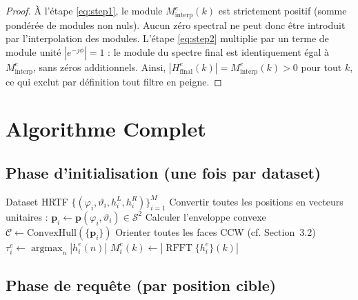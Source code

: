 \documentclass[12pt, a4paper]{article}
\theoremstyle{definition}
\newcommand{\vect}[1]{\bm{#1}}
\newcommand{\abs}[1]{\left| #1 \right|}
\DeclareMathOperator{\argmax}{argmax}
\DeclareMathOperator{\rfft}{RFFT}
\begin{document}
\begin{proof}
  À l'étape \eqref{eq:step1}, le module $M_{\mathrm{interp}}^e(k)$ est
  strictement positif (somme pondérée de modules non nuls). Aucun zéro
  spectral ne peut donc être introduit par l'interpolation des modules.
  L'étape \eqref{eq:step2} multiplie par un terme de module unité
  $|e^{-j\phi}| = 1$ : le module du spectre final est identiquement égal
  à $M_{\mathrm{interp}}^e$, sans zéros additionnels.
  Ainsi, $|H_{\mathrm{final}}^e(k)| = M_{\mathrm{interp}}^e(k) > 0$
  pour tout $k$, ce qui exclut par définition tout filtre en peigne.
\end{proof}

\section{Algorithme Complet}

\subsection{Phase d'initialisation (une fois par dataset)}

\begin{algorithm}[H]
\caption{Initialisation de l'interpolateur HRTF}
\begin{algorithmic}[1]
\Require Dataset HRTF $\{(\varphi_i, \vartheta_i, h_i^L, h_i^R)\}_{i=1}^{M}$
\State Convertir toutes les positions en vecteurs unitaires :
  $\vect{p}_i \gets \vect{p}(\varphi_i, \vartheta_i) \in \mathcal{S}^2$
\State Calculer l'enveloppe convexe $\mathcal{C} \gets \mathrm{ConvexHull}(\{\vect{p}_i\})$
\State Orienter toutes les faces CCW (cf. Section~3.2)
  \State $\tau_i^e \gets \argmax_n \abs{h_i^e(n)}$ 
  \State $M_i^e(k) \gets \abs{\rfft\{h_i^e\}(k)}$ 
\EndFor
\end{algorithmic}
\end{algorithm}

\subsection{Phase de requête (par position cible)}
\end{document}
